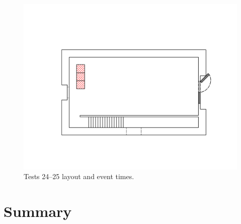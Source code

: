 \documentclass[12pt,oneside]{book}
\begin{document}
\begin{figure}[!ht]
\begin{minipage}[b]{0.9\columnwidth}
	\includegraphics[width=0.94\columnwidth]{../Figures/Floor_Plans/West_Structure_1st_Floor_Test_24}
\end{minipage}
\caption{Tests 24--25 layout and event times.}
\label{fig:west_test_24}
\end{figure}
\FloatBarrier

\clearpage

\chapter{Summary}
\label{chap:Summary}



\appendix
\end{document}
